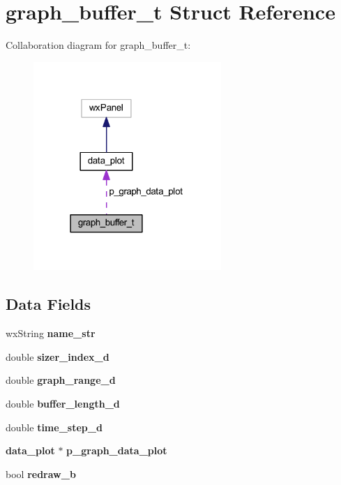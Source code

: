 \section{graph\+\_\+buffer\+\_\+t Struct Reference}
\label{structgraph__buffer__t}


Collaboration diagram for graph\+\_\+buffer\+\_\+t\+:
\nopagebreak
\begin{figure}[H]
\begin{center}
\leavevmode
\includegraphics[width=202pt]{structgraph__buffer__t__coll__graph}
\end{center}
\end{figure}
\subsection*{Data Fields}
\begin{DoxyCompactItemize}
\item 
\mbox{\label{structgraph__buffer__t_a4f420117d8c68001f3c555687fee0d84}} 
wx\+String {\bfseries name\+\_\+str}
\item 
\mbox{\label{structgraph__buffer__t_aae99f717aadbf88f890c71a293468af8}} 
double {\bfseries sizer\+\_\+index\+\_\+d}
\item 
\mbox{\label{structgraph__buffer__t_acdc7d1aa78e855984e1073f7e975258d}} 
double {\bfseries graph\+\_\+range\+\_\+d}
\item 
\mbox{\label{structgraph__buffer__t_a4a18a8710e0a906dd8a0d63fbf7c529e}} 
double {\bfseries buffer\+\_\+length\+\_\+d}
\item 
\mbox{\label{structgraph__buffer__t_a812bd0a869f23ca14d35715545713db0}} 
double {\bfseries time\+\_\+step\+\_\+d}
\item 
\mbox{\label{structgraph__buffer__t_ac23ca840d85a64471e2c2d46b38994a4}} 
\textbf{ data\+\_\+plot} $\ast$ {\bfseries p\+\_\+graph\+\_\+data\+\_\+plot}
\item 
\mbox{\label{structgraph__buffer__t_a41a6ffa0a419bd1cc86b38f4a04c3467}} 
bool {\bfseries redraw\+\_\+b}
\end{DoxyCompactItemize}


